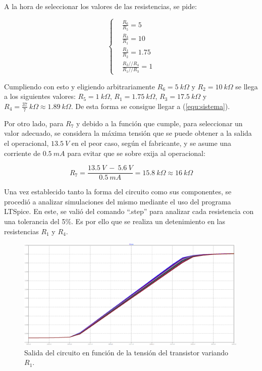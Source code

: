 \documentclass[a4paper]{article}
\begin{document}
A la hora de seleccionar los valores de las resistencias, se pide:

\begin{equation*}
\left\{
\begin{aligned}
  		&	\frac{R_6}{R_5} = 5	\\
  		&	\frac{R_3}{R_1} = 10	\\
  		&	\frac{R_3}{R_2} = 1.75	\\
  		&	\frac{R_2 // R_4}{R_1 // R_3} = 1
\end{aligned}
\right.
\end{equation*}

Cumpliendo con esto y eligiendo arbitrariamente $R_6 = 5 \ k\Omega$ y $R_2 = 10 \ k\Omega$ se llega a los siguientes valores: $R_5 = 1 \ k\Omega$, $R_1 = 1.75 \ k\Omega$, $R_3 = 17.5 \ k\Omega$ y $R_4 = \frac{37}{7} \ k\Omega \approx 1.89 \ k\Omega$. De esta forma se consigue llegar a (\ref{equ:sistema}).

Por otro lado, para $R_7$ y debido a la función que cumple, para seleccionar un valor adecuado, se considera la máxima tensión que se puede obtener a la salida el operacional, $13.5 \ V$ en el peor caso, según el fabricante, y se asume una corriente de $0.5 \ mA$ para evitar que se sobre exija al operacional:

\begin{equation}
	R_7 = \frac{13.5 \ V \ - \ 5.6 \ V}{0.5 \ mA} = 15.8 \ k\Omega \approx 16 \ k\Omega
	\label{equ:rzener}
\end{equation}

Una vez establecido tanto la forma del circuito como sus componentes, se procedió a analizar simulaciones del mismo mediante el uso del programa LTSpice. En este, se valió del comando ``.step'' para analizar cada resistencia con una tolerancia del 5\%. Es por ello que se realiza un detenimiento en las resistencias $R_1$ y $R_4$.

\begin{figure}[H]
	\centering
	\includegraphics[width=0.99\textwidth]{Ejercicio6/Imagenes/StepR1-M1.png}
	\caption{Salida del circuito en función de la tensión del transistor variando $R_1$.}
	\label{fig:r1-M1}
\end{figure}
\end{document}
